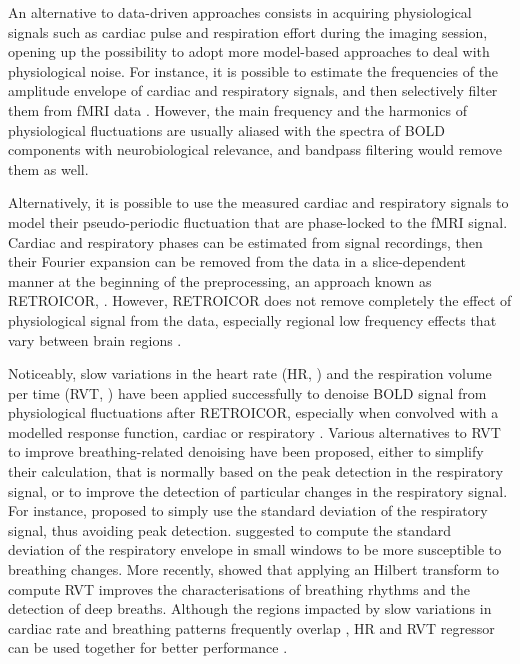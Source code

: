 An alternative to data-driven approaches consists in acquiring physiological
signals such as cardiac pulse and respiration effort during the imaging session,
opening up the possibility to adopt more model-based approaches to deal with
physiological noise. For instance, it is possible to estimate the frequencies of
the amplitude envelope of cardiac and respiratory signals, and then selectively
filter them from fMRI data \citep{Biswal1996Reductionphysiologicalfluctuations}.
However, the main frequency and the harmonics of physiological fluctuations are
usually aliased with the spectra of BOLD components with neurobiological
relevance, and bandpass filtering would remove them as well.

Alternatively, it is possible to use the measured cardiac and respiratory
signals to model their pseudo-periodic fluctuation that are phase-locked to the
fMRI signal. Cardiac and respiratory phases can be estimated from signal
recordings, then their Fourier expansion can be removed from the data in a
slice-dependent manner at the beginning of the preprocessing, an approach known
as RETROICOR, \cite{Glover2000Imagebasedmethod}. However, RETROICOR does not
remove completely the effect of physiological signal from the data, especially
regional low frequency effects that vary between brain regions
\citep{Birn2006Separatingrespiratoryvariation,Chang2009Influenceheartrate,Shmueli2007Lowfrequencyfluctuations}.

Noticeably, slow variations in the heart rate (HR,
\cite{Shmueli2007Lowfrequencyfluctuations}) and the respiration volume per time
(RVT, \cite{Birn2006Separatingrespiratoryvariation}) have been applied
successfully to denoise BOLD signal from physiological fluctuations after
RETROICOR, especially when convolved with a modelled response function, cardiac
\citep{Chang2009Influenceheartrate} or respiratory
\citep{Birn2008respirationresponsefunction}. Various alternatives to
RVT to improve breathing-related denoising have been proposed,
either to simplify their calculation, that is normally based on the peak
detection in the respiratory signal, or to improve the detection of particular
changes in the respiratory signal. For instance,
\cite{Chang2009Relationshiprespirationend} proposed to simply use the standard
deviation of the respiratory signal, thus avoiding peak detection.
\cite{Power2018RiddingfMRIdata} suggested to compute the standard deviation of
the respiratory envelope in small windows to be more susceptible to breathing
changes\cite{I think this is not the proper reference by Power for this method}.
More recently, \cite{Harrison2021Hilbertbasedmethod} showed that applying an
Hilbert transform to compute RVT improves the characterisations of breathing
rhythms and the detection of deep breaths. Although the regions impacted by slow
variations in cardiac rate and breathing patterns frequently overlap
\citep{Chang2009Influenceheartrate,Kassinopoulos2019Identificationphysiologicalresponse},
HR and RVT regressor can be used together for better performance
\citep{Chang2009Influenceheartrate}.

